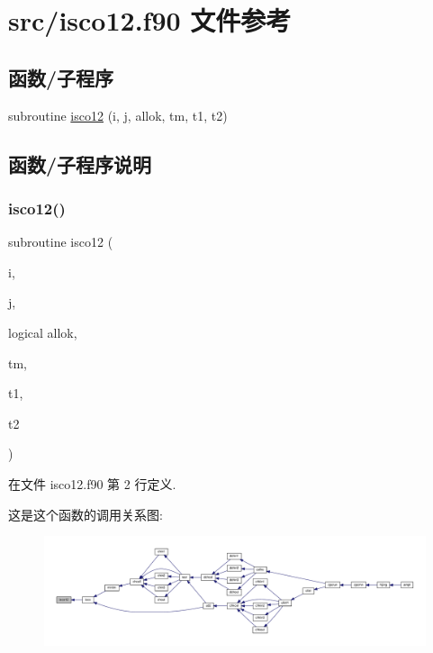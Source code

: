 \hypertarget{isco12_8f90}{}\section{src/isco12.f90 文件参考}
\label{isco12_8f90}
\subsection*{函数/子程序}
\begin{DoxyCompactItemize}
\item 
subroutine \mbox{\hyperlink{isco12_8f90_a5daac16dffd42cc38f510f19f57fd743}{isco12}} (i, j, allok, tm, t1, t2)
\end{DoxyCompactItemize}


\subsection{函数/子程序说明}
\mbox{\label{isco12_8f90_a5daac16dffd42cc38f510f19f57fd743}} 
\subsubsection{\texorpdfstring{isco12()}{isco12()}}
{\footnotesize\ttfamily subroutine isco12 (\begin{DoxyParamCaption}\item[{}]{i,  }\item[{}]{j,  }\item[{logical}]{allok,  }\item[{}]{tm,  }\item[{}]{t1,  }\item[{}]{t2 }\end{DoxyParamCaption})}



在文件 isco12.\+f90 第 2 行定义.

这是这个函数的调用关系图\+:
\nopagebreak
\begin{figure}[H]
\begin{center}
\leavevmode
\includegraphics[width=350pt]{isco12_8f90_a5daac16dffd42cc38f510f19f57fd743_icgraph}
\end{center}
\end{figure}
